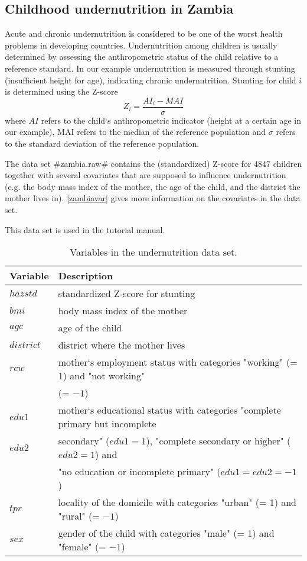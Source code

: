 \subsection{Childhood undernutrition in Zambia}
\label{zambia}  

Acute and chronic undernutrition is considered to be one of the
worst health problems in developing countries. Undernutrition
among children is usually determined by assessing the
anthropometric status of the child relative to a reference
standard. In our example undernutrition is measured through
stunting (insufficient height for age), indicating chronic
undernutrition. Stunting for child $i$ is determined using the
Z-score
\[Z_i = \frac{AI_i-MAI}{\sigma}\]
where $AI$ refers to the child`s anthropometric indicator (height
at a certain age in our example), MAI refers to the median of the
reference population and $\sigma$ refers to the standard deviation
of the reference population.

The data set #zambia.raw# contains the (standardized) Z-score for
4847 children together with several covariates that are supposed
to influence undernutrition (e.g. the body mass index of the
mother, the age of the child, and the district the mother lives
in). \autoref{zambiavar} gives more information on the covariates
in the data set.

This data set is used in the tutorial manual.

\begin{table}
\begin{center}
\begin{tabular}{|l|l|}
 \hline
 {\bf Variable} & {\bf Description}\\
 \hline
 $hazstd$ & standardized Z-score for stunting\\
 $bmi$ & body mass index of the mother\\
 $agc$ & age of the child\\
 $district$ & district where the mother lives\\
 $rcw$ & mother`s employment status with categories "working" (= 1) and "not working" \\
 & (= $-1$)\\
 $edu1$ & mother`s educational status with categories "complete primary but incomplete\\
 $edu2$ & secondary" ($edu1=1$), "complete secondary or higher" ($edu2=1$) and\\
 & "no education or incomplete primary" ($edu1=edu2=-1$)\\
 $tpr$ & locality of the domicile with categories "urban" (= 1) and "rural" (= $-1$)\\
 $sex$ & gender of the child with categories "male" (= 1) and
 "female" (= $-1$)\\
 \hline
\end{tabular}
{\em\caption{Variables in the undernutrition data set.
\label{zambiavar}}}
\end{center}
\end{table}
